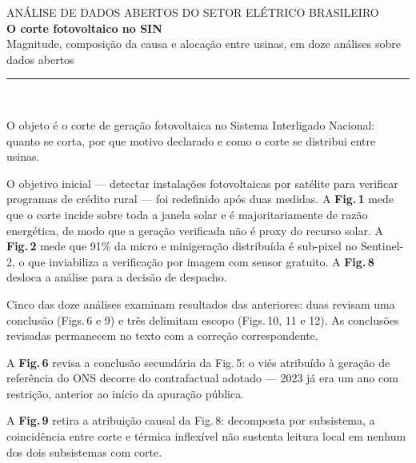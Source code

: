\documentclass[10pt]{article}
\newcommand{\bloco}[1]{\vspace{2pt}{\color{vermelho}\footnotesize\textbf{#1}}\par\vspace{-2pt}}
\begin{document}
\vspace*{6mm}
{\color{claro}\textsf{ANÁLISE DE DADOS ABERTOS DO SETOR ELÉTRICO BRASILEIRO}}\\[3mm]
{\fontsize{30}{34}\selectfont\textbf{O corte fotovoltaico no SIN}}\\[2mm]
{\fontsize{16}{20}\selectfont\color{cinza} Magnitude, composição da causa e alocação entre usinas, em doze análises sobre dados abertos}\\[6mm]
{\color{claro}\rule{\linewidth}{0.4pt}}\\[4mm]

\begin{minipage}[t]{0.47\linewidth}\vspace{0pt}
\bloco{Escopo}
O objeto é o corte de geração fotovoltaica no Sistema Interligado Nacional: quanto
se corta, por que motivo declarado e como o corte se distribui entre usinas.

O objetivo inicial --- detectar instalações fotovoltaicas por satélite para verificar
programas de crédito rural --- foi redefinido após duas medidas. A \textbf{Fig.\,1}
mede que o corte incide sobre toda a janela solar e é majoritariamente de razão
energética, de modo que a geração verificada não é proxy do recurso solar. A
\textbf{Fig.\,2} mede que 91\% da micro e minigeração distribuída é sub-pixel no
Sentinel-2, o que inviabiliza a verificação por imagem com sensor gratuito. A
\textbf{Fig.\,8} desloca a análise para a decisão de despacho.

\bloco{Revisões internas}
Cinco das doze análises examinam resultados das anteriores: duas revisam uma
conclusão (Figs.\,6 e 9) e três delimitam escopo (Figs.\,10, 11 e 12). As conclusões
revisadas permanecem no texto com a correção correspondente.

A \textbf{Fig.\,6} revisa a conclusão secundária da Fig.\,5: o viés atribuído à
geração de referência do ONS decorre do contrafactual adotado --- 2023 já era um ano
com restrição, anterior ao início da apuração pública.

A \textbf{Fig.\,9} retira a atribuição causal da Fig.\,8: decomposta por subsistema, a
coincidência entre corte e térmica inflexível não sustenta leitura local em nenhum dos
dois subsistemas com corte.

\end{minipage}\hfill
\end{document}
